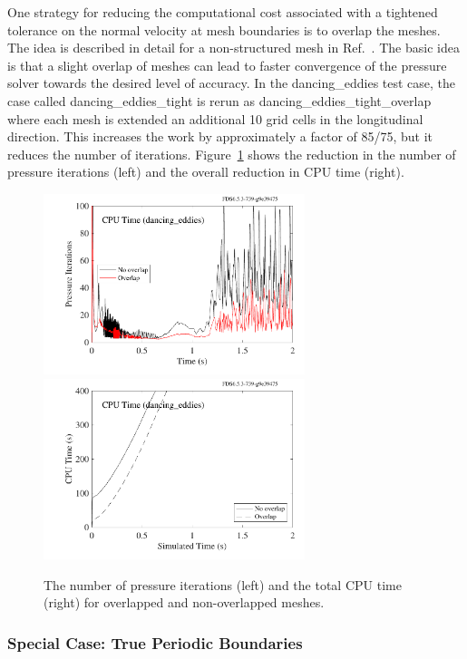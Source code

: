\documentclass[11pt]{book}
\begin{document}
One strategy for reducing the computational cost associated with a tightened tolerance on the normal velocity at mesh boundaries is to overlap the meshes. The idea is described in detail for a non-structured mesh in Ref.~\cite{Grinberg:JCP2010}. The basic idea is that a slight overlap of meshes can lead to faster convergence of the pressure solver towards the desired level of accuracy. In the {\ct dancing\_eddies} test case, the case called {\ct dancing\_eddies\_tight} is rerun as {\ct dancing\_eddies\_tight\_overlap} where each mesh is extended an additional 10 grid cells in the longitudinal direction. This increases the work by approximately a factor of 85/75, but it reduces the number of iterations. Figure~\ref{dancing_eddies_overlap} shows the reduction in the number of pressure iterations (left) and the overall reduction in CPU time (right).

\begin{figure}[ht]
\includegraphics[width=3in]{SCRIPT_FIGURES/dancing_eddies_iterations}
\includegraphics[width=3in]{SCRIPT_FIGURES/dancing_eddies_tight_overlap}
\caption[Reduction of pressure iterations in the {\ct dancing\_eddies} test cases]{The number of pressure iterations (left) and the total CPU time (right) for overlapped and non-overlapped meshes.}
\label{dancing_eddies_overlap}
\end{figure}

\subsubsection{Special Case: True Periodic Boundaries}
\label{sec:true_periodic_boundaries}
\end{document}
